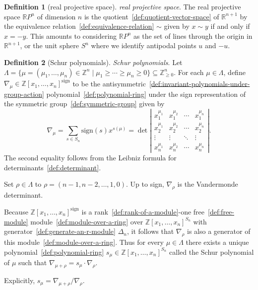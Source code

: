 \documentclass[12pt,a4paper]{article}
\theoremstyle{definition}
\newtheorem{definition}{Definition}
\begin{document}
\begin{definition}[real projective space]\label{def:real-projective-space}
\emph{real projective space}. The real projective space $\mathbb RP^n$ of dimension $n$ is the quotient~\ref{def:quotient-vector-space} of $\mathbb R^{n+1}$ by the equivalence relation~\ref{def:equivalence-relation} $\sim$ given by $x\sim y$ if and only if $x=-y$. This amounts to considering $\mathbb RP^n$ as the set of lines through the origin in $\mathbb R^{n+1}$, or the unit sphere $S^n$ where we identify antipodal points $u$ and $-u$.
\end{definition}

\begin{definition}[Schur polynomials]\label{def:schur-polynomials}
\emph{Schur polynomials}. Let $\Lambda=\{\mu = (\mu_1,\dots, \mu_n)\in\mathbb Z^n \mid \mu_1\geq \cdots\geq \mu_n \geq 0\} \subseteq \mathbb Z^n_{\geq 0}$. For each $\mu \in \Lambda$, define $\nabla_\mu \in \mathbb Z[x_1,\dots, x_n]^\text{sign}$ to be the antisymmetric~\ref{def:invariant-polynomials-under-group-action} polynomial~\ref{def:polynomial-ring} under the sign representation of the symmetric group~\ref{def:symmetric-group} given by $$\nabla_\mu = \sum_{s\in S_n} \text{sign}(s) x^{s(\mu)} = \det\left\vert \begin{matrix}x_1^{\mu_1}  & x_1^{\mu_2} & \cdots & x_1^{\mu_n} \\ x_2^{\mu_1} & x_2^{\mu_2} & \cdots & x_2^{\mu_n} \\ \vdots &\vdots & \ddots &\vdots \\ x_n^{\mu_1} & x_n^{\mu_2}&\cdots & x_n^{\mu_n}\end{matrix} \right\vert .$$ The second equality follows from the Leibniz formula for determinants~\ref{def:determinant}. 

Set $\rho \in \Lambda$ to $\rho = (n-1,n-2,\dots, 1, 0)$. Up to sign, $\nabla_\rho$ is the Vandermonde determinant. 

Because $\mathbb Z[x_1,\dots, x_n]^\text{sign}$ is a rank~\ref{def:rank-of-a-module}-one free~\ref{def:free-module} module~\ref{def:module-over-a-ring} over $\mathbb Z[x_1,\dots, x_n]^{S_n}$ with generator~\ref{def:generate-an-r-module} $\Delta_n$, it follows that $\nabla_\rho$ is also a generator of this module~\ref{def:module-over-a-ring}. Thus for every $\mu\in \Lambda$ there exists a unique polynomial~\ref{def:polynomial-ring} $s_\mu\in\mathbb Z[x_1,\dots, x_n]^{S_n}$ called the Schur polynomial of $\mu$ such that $\nabla_{\mu + \rho} = s_\mu \cdot\nabla_\rho$. 

Explicitly, $s_\mu = \nabla_{\mu + \rho}/\nabla_\rho$.
\end{definition}
\end{document}
